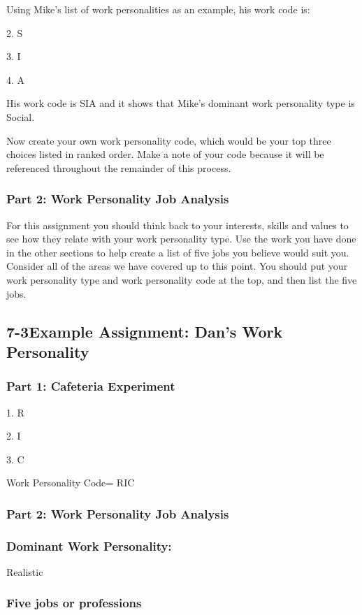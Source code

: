 Using Mike's list of work personalities as an example, his work code is:

2. S

3. I

4. A

His work code is SIA and it shows that Mike's dominant work personality type is Social.

Now create your own work personality code, which would be your top three choices listed in ranked order. Make a note of your code because it will be referenced throughout the remainder of this process.
\subsubsection*{Part 2: Work Personality Job Analysis}
For this assignment you should think back to your interests, skills and values to see how they relate with your work personality type. Use the work you have done in the other sections to help create a list of five jobs you believe would suit you. Consider all of the areas we have covered up to this point. You should put your work personality type and work personality code at the top, and then list the five jobs.

\pagebreak \subsection*{7-3\quad Example Assignment: Dan's Work Personality}
\subsubsection*{Part 1: Cafeteria Experiment}

1. R

2. I

3. C

Work Personality Code= RIC

\subsubsection*{Part 2: Work Personality Job Analysis}
\subsubsection*{Dominant Work Personality:} Realistic

\subsubsection*{Five jobs or professions}

